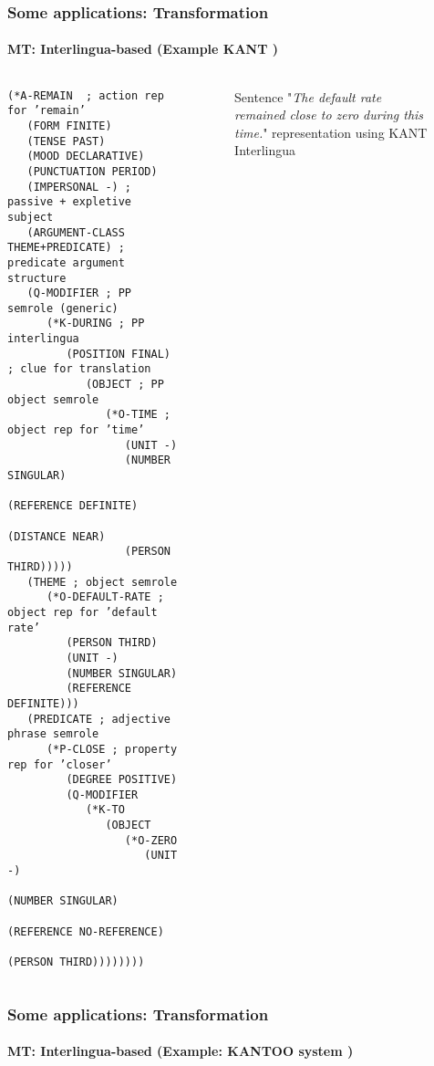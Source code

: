 \documentclass[xcolor=table]{beamer}
\begin{document}
\begin{frame}[fragile]
	\frametitle{Some applications: Transformation}
	\framesubtitle{MT: Interlingua-based (Example KANT \cite{98-czuba-al})}
\begin{columns}
\begin{column}{0.5\textwidth}
\bfseries\fontsize{4}{5}\selectfont
\begin{verbatim}
(*A-REMAIN  ; action rep for ’remain’
   (FORM FINITE)
   (TENSE PAST)
   (MOOD DECLARATIVE)
   (PUNCTUATION PERIOD)
   (IMPERSONAL -) ; passive + expletive subject
   (ARGUMENT-CLASS THEME+PREDICATE) ; predicate argument structure
   (Q-MODIFIER ; PP semrole (generic)
      (*K-DURING ; PP interlingua
         (POSITION FINAL) ; clue for translation
            (OBJECT ; PP object semrole
               (*O-TIME ; object rep for ’time’
                  (UNIT -)
                  (NUMBER SINGULAR)
                  (REFERENCE DEFINITE)
                  (DISTANCE NEAR)
                  (PERSON THIRD)))))
   (THEME ; object semrole
      (*O-DEFAULT-RATE ; object rep for ’default rate’
         (PERSON THIRD)
         (UNIT -)
         (NUMBER SINGULAR)
         (REFERENCE DEFINITE)))
   (PREDICATE ; adjective phrase semrole
      (*P-CLOSE ; property rep for ’closer’
         (DEGREE POSITIVE)
         (Q-MODIFIER
            (*K-TO
               (OBJECT
                  (*O-ZERO
                     (UNIT -)
                     (NUMBER SINGULAR)
                     (REFERENCE NO-REFERENCE)
                     (PERSON THIRD))))))))
\end{verbatim}
\end{column}
\begin{column}{0.5\textwidth}
	\begin{figure}
		\caption{Sentence "\textit{The default rate remained close to zero during this time.}" representation using KANT Interlingua \cite{98-czuba-al}}
	\end{figure}
\end{column}
\end{columns}


\end{frame}

\begin{frame}[fragile]
	\frametitle{Some applications: Transformation}
	\framesubtitle{MT: Interlingua-based (Example: KANTOO system \cite{00-nyberg-al})}
	
	
\end{frame}
\end{document}
